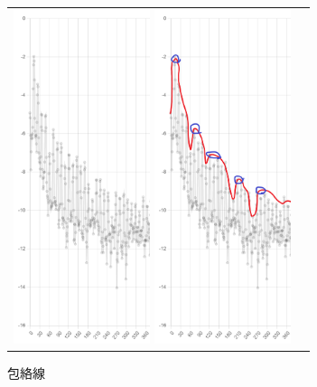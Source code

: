 \documentclass[uplatex,a4paper,11pt]{jsarticle}
\begin{document}
\begin{figure}[h]
  \begin{tabular}{cc}
    \begin{minipage}[t]{0.33\hsize}
      \centering
      \includegraphics[width=40mm]{picture/power_spectra.png}
      \caption{パワースペクトル密度}
      \label{fig:psd}
    \end{minipage}
    \begin{minipage}[t]{0.33\hsize}
      \centering
      \includegraphics[width=40mm]{picture/envelope.png}
      \caption{包絡線}
      \label{fig:envelope}
    \end{minipage}
    \begin{minipage}[t]{0.33\hsize}
      \centering

\end{minipage}
\end{tabular}
\end{figure}
\end{document}
